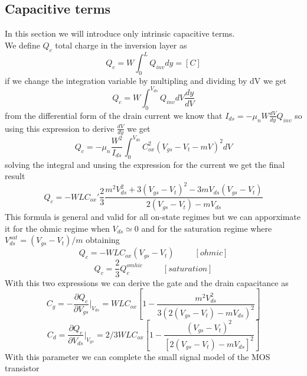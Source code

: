 \subsection{Capacitive terms}
In this section we will introduce only intrinsic capacitive terms.\\
We define $Q_c$ total charge in the inversion layer as 
\begin{equation}
Q_c=W\int^L_0Q_{inv}dy=[C]
\end{equation}
if we change the integration variable by multipling and dividing by dV we get
\begin{equation}
Q_c=W\int^{V_{ds}}_0Q_{inv}dV\frac{dy}{dV}
\end{equation}
from the differential form of the drain current we know that $I_{ds}=-\mu_nW \frac{dV}{dy}Q_{inv}$ so using this expression to derive $\frac{dV}{dy}$ we get
\begin{equation}
Q_c=-\mu_n \frac{W^2}{I_{ds}}\int^{V_{ds}}_0 C_{ox}^2(V_{gs}-V_t-mV)^2dV
\end{equation}
solving the integral and unsing the expression for the current we get the final result
\begin{equation}
Q_c=-WLC_{ox}'\frac{2}{3} \frac{m^2V_{ds}^2 + 3(V_{gs}-V_t)^2 -3mV_{ds}(V_{gs}-V_t)}{2(V_{gs}-V_t)-mV_{ds}}
\end{equation}
This formula is general and valid for all on-state regimes but we can apporximate it for the ohmic regime when $V_{ds}\simeq 0$ and for the saturation regime where $V_{ds}^{sat}=(V_{gs}-V_t)/m$ obtaining
\begin{equation}
Q_c=-WLC_{ox}(V_{gs}-V_t)   \ \ \ \ \ \ \ \ \ \ \ [ohmic]
\end{equation}
\begin{equation}
Q_c=\frac{2}{3}  Q_c^{omhic} \ \ \ \ \ \ \ \ \ \ \ [saturation]
\end{equation}
With this two expressions we can derive the gate and the drain capacitance as
\begin{equation}
C_g=-\frac{\partial Q_c}{\partial V_{gs}}|_{V_{ds}}=WLC_{ox}[1-\frac{m^2V_{ds}^2}{3(2(V_{gs}-V_t)-mV_{ds})^2}]
\end{equation}
\begin{equation}
C_d=\frac{\partial Q_c}{\partial V_{ds}}|_{V_{gs}}=2/3WLC_{ox}[1-\frac{(V_{gs}-V_{t})^2}{[2(V_{gs}-V_t)-mV_{ds}]^2}]
\end{equation}
With this parameter we can complete the small signal model of the MOS transistor\\

